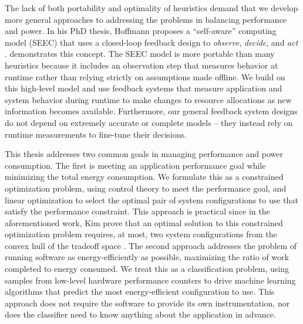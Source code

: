 The lack of both portability and optimality of heuristics demand that we develop more general approaches to addressing the problems in balancing performance and power.
In his PhD thesis, Hoffmann proposes a ``self-aware'' computing model (SEEC) that uses a closed-loop feedback design to \emph{observe}, \emph{decide}, and \emph{act} \cite{HoffmannPhD}.
 demonstrates this concept.
The SEEC model is more portable than many heuristics because it includes an observation step that measures behavior at runtime rather than relying strictly on assumptions made offline.
We build on this high-level model and use feedback systems that measure application and system behavior during runtime to make changes to resource allocations as new information becomes available.
Furthermore, our general feedback system designs do not depend on extremely accurate or complete models -- they instead rely on runtime measurements to fine-tune their decisions.

This thesis addresses two common goals in managing performance and power consumption.
The first is meeting an application performance goal while minimizing the total energy consumption.
We formulate this as a constrained optimization problem, using control theory to meet the performance goal, and linear optimization to select the optimal pair of system configurations to use that satisfy the performance constraint.
This approach is practical since in the aforementioned work, Kim \etal prove that an optimal solution to this constrained optimization problem requires, at most, two system configurations from the convex hull of the tradeoff space \cite{kim-cpsna2015}.
The second approach addresses the problem of running software as energy-efficiently as possible, \ie maximizing the ratio of work completed to energy consumed.
We treat this as a classification problem, using samples from low-level hardware performance counters to drive machine learning algorithms that predict the most energy-efficient configuration to use.
This approach does not require the software to provide its own instrumentation, nor does the classifier need to know anything about the application in advance.
